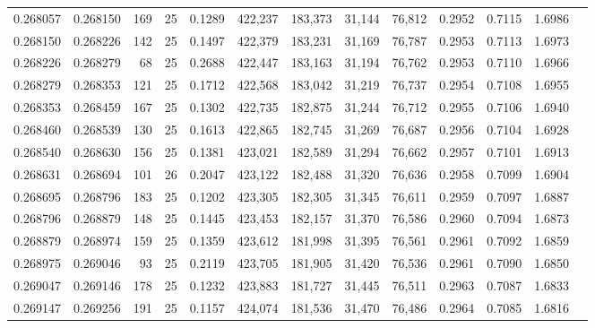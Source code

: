 \begin{tabular}{rrrrrrrrrrrrr}
0.268057 & 0.268150 &   169 &  25 &                                     0.1289 & 422,237 & 183,373 &  31,144 &  76,812 & 0.2952 & 0.7115 & 1.6986 \\
0.268150 & 0.268226 &   142 &  25 &                                     0.1497 & 422,379 & 183,231 &  31,169 &  76,787 & 0.2953 & 0.7113 & 1.6973 \\
0.268226 & 0.268279 &    68 &  25 &                                     0.2688 & 422,447 & 183,163 &  31,194 &  76,762 & 0.2953 & 0.7110 & 1.6966 \\
0.268279 & 0.268353 &   121 &  25 &                                     0.1712 & 422,568 & 183,042 &  31,219 &  76,737 & 0.2954 & 0.7108 & 1.6955 \\
0.268353 & 0.268459 &   167 &  25 &                                     0.1302 & 422,735 & 182,875 &  31,244 &  76,712 & 0.2955 & 0.7106 & 1.6940 \\
0.268460 & 0.268539 &   130 &  25 &                                     0.1613 & 422,865 & 182,745 &  31,269 &  76,687 & 0.2956 & 0.7104 & 1.6928 \\
0.268540 & 0.268630 &   156 &  25 &                                     0.1381 & 423,021 & 182,589 &  31,294 &  76,662 & 0.2957 & 0.7101 & 1.6913 \\
0.268631 & 0.268694 &   101 &  26 &                                     0.2047 & 423,122 & 182,488 &  31,320 &  76,636 & 0.2958 & 0.7099 & 1.6904 \\
0.268695 & 0.268796 &   183 &  25 &                                     0.1202 & 423,305 & 182,305 &  31,345 &  76,611 & 0.2959 & 0.7097 & 1.6887 \\
0.268796 & 0.268879 &   148 &  25 &                                     0.1445 & 423,453 & 182,157 &  31,370 &  76,586 & 0.2960 & 0.7094 & 1.6873 \\
0.268879 & 0.268974 &   159 &  25 &                                     0.1359 & 423,612 & 181,998 &  31,395 &  76,561 & 0.2961 & 0.7092 & 1.6859 \\
0.268975 & 0.269046 &    93 &  25 &                                     0.2119 & 423,705 & 181,905 &  31,420 &  76,536 & 0.2961 & 0.7090 & 1.6850 \\
0.269047 & 0.269146 &   178 &  25 &                                     0.1232 & 423,883 & 181,727 &  31,445 &  76,511 & 0.2963 & 0.7087 & 1.6833 \\
0.269147 & 0.269256 &   191 &  25 &                                     0.1157 & 424,074 & 181,536 &  31,470 &  76,486 & 0.2964 & 0.7085 & 1.6816 \\

\end{tabular}

